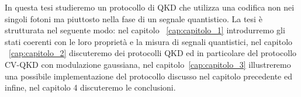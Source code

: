 In questa tesi studieremo un protocollo di QKD che utilizza una codifica non nei singoli fotoni ma piuttosto nella fase di un segnale quantistico. La tesi è strutturata nel seguente modo: nel capitolo ~\ref{cap:capitolo_1} introdurremo gli stati coerenti con le loro propriet\`a e la misura di segnali quantistici, nel capitolo ~\ref{cap:capitolo_2} discuteremo dei protocolli QKD ed in particolare del protocollo CV-QKD con modulazione gaussiana,  nel capitolo~\ref{cap:capitolo_3} illustreremo una possibile implementazione del protocollo discusso nel capitolo precedente ed infine, nel capitolo 4 discuteremo le conclusioni.


